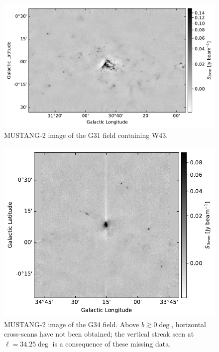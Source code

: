 \documentclass[twocolumn]{aastex62}
\newcommand{\MUSTANG}{MUSTANG-2\xspace}
\begin{document}
\begin{figure}[htp]
    \includegraphics[width=17cm]{figures/G31_overview.pdf}
\caption{\MUSTANG image of the G31 field containing W43.
}
\label{fig:w43overview}
\end{figure}


\begin{figure}[htp]
\includegraphics[width=17cm]{figures/G34_overview.pdf}
\caption{\MUSTANG image of the G34 field.  Above $b\gtrsim 0\deg$,
horizontal cross-scans have not been obtained; the vertical streak seen
at $\ell=34.25\deg$ is a consequence of these missing data.}
\label{fig:g34overview}
\end{figure}
\end{document}
